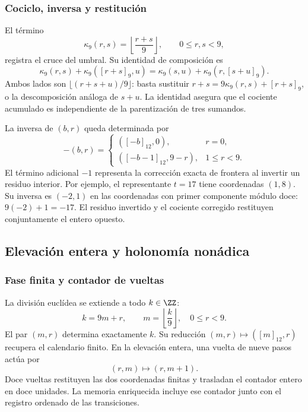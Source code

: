 \subsubsection{Cociclo, inversa y restitución}

El término
\[
 \kappa_9(r,s)=\left\lfloor\frac{r+s}9\right\rfloor,
 \qquad 0\leq r,s<9,
\]
registra el cruce del umbral. Su identidad de composición es
\begin{equation}
 \kappa_9(r,s)+\kappa_9([r+s]_9,u)
 =\kappa_9(s,u)+\kappa_9(r,[s+u]_9).
 \label{eq:cal-cociclo}
\end{equation}
Ambos lados son $\lfloor(r+s+u)/9\rfloor$: basta sustituir
$r+s=9\kappa_9(r,s)+[r+s]_9$, o la descomposición análoga de $s+u$.
La identidad asegura que el cociente acumulado es independiente de la
parentización de tres sumandos.

La inversa de $(b,r)$ queda determinada por
\[
 -(b,r)=
 \begin{cases}
 ([-b]_{12},0),&r=0,\\
 ([-b-1]_{12},9-r),&1\leq r<9.
 \end{cases}
\]
El término adicional $-1$ representa la corrección exacta de frontera al
invertir un residuo interior. Por ejemplo, el representante $t=17$ tiene
coordenadas $(1,8)$. Su inversa es $(-2,1)$ en las coordenadas con
primer componente módulo doce: $9(-2)+1=-17$. El residuo invertido y
el cociente corregido restituyen conjuntamente el entero opuesto.

\subsection{Elevación entera y holonomía nonádica}

\subsubsection{Fase finita y contador de vueltas}

La división euclídea se extiende a todo $k\in\ZZ$:
\[
 k=9m+r,\qquad m=\left\lfloor\frac k9\right\rfloor,
 \quad0\leq r<9.
\]
El par $(m,r)$ determina exactamente $k$. Su reducción
$(m,r)\mapsto([m]_{12},r)$ recupera el calendario finito. En la
elevación entera, una vuelta de nueve pasos actúa por
\begin{equation}
 (r,m)\longmapsto(r,m+1).
 \label{eq:cal-vuelta-entera}
\end{equation}
Doce vueltas restituyen las dos coordenadas finitas y trasladan el
contador entero en doce unidades. La memoria enriquecida incluye ese
contador junto con el registro ordenado de las transiciones.

